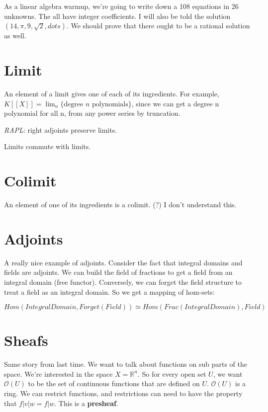 \documentclass{book}
\renewcommand{\O}{\ensuremath{\mathcal{O}}}
\theoremstyle{definition}
\begin{document}
As a linear algebra warmup, we're going to write down a 108 equations
in 26 unknowns. The all have integer coefficients. I will also be told the solution
$(14, \pi, 9, \sqrt{2}, dots)$.  We should prove that there ought to be a
rational solution as well.

\section{Limit}

An element of a limit gives one of each of its ingredients. For example,
$K[[X]] = \lim_n \{ \text{degree $n$ polynomials} \}$, since we can get
a degree n polynomial for all n, from any power series by truncation.

\emph{RAPL}: right adjoints preserve limits.

Limits commute with limits.


\section{Colimit}

An element of one of its ingredients is a colimit. (?) I don't understand this.

\section{Adjoints}

A really nice example of adjoints. Consider the fact that integral domains
and fields are adjoints. We can build the field of fractions to get a field
from an integral domain (free functor). Conversely, we can forget the
field structure to treat a field as an integral domain. So we get a mapping
of hom-sets:

$$
Hom(IntegralDomain, Forget(Field)) \simeq Hom(Frac(IntegralDomain), Field)
$$

\section{Sheafs}

Same story from last time. We want to talk about functions on sub parts of the space.
We're interested in the space $X = \mathbb R^n$.
So for every open set $U$, we want $\O(U)$ to be the set of continuous
functions that are defined on $U$. $\O(U)$ is a ring. We can restrict functions,
and restrictions can need to have the property that $f|v|w = f|w$. This is
a \textbf{presheaf}.
\end{document}
